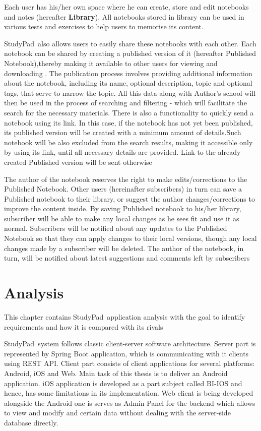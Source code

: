 \documentclass[thesis=B,english]{FITthesis}[2012/10/20]
\newcommand{\appname}{StudyPad}
\begin{document}
Each user has his/her own space where he can create, store and edit notebooks and notes (hereafter \textbf{Library}). All notebooks stored in library can be used in various tests and exercises to help users to memorise its content. 

\appname\ also allows users to easily share these notebooks with each other. Each notebook can be shared by creating a published version of it (hereafter Published Notebook),thereby making it available to other users for viewing and downloading .
The publication process involves providing additional information about the notebook, including its name, optional description, topic and optional tags, that serve to narrow the topic. All this data along with Author's school will then be used in the process of searching and filtering - which will facilitate the search for the necessary materials. There is also a functionality to quickly send a notebook using its link. In this case, if the notebook has not yet been published, its published version will be created with a minimum amount of details.Such notebook will be also excluded from the search results, making it accessible only by using its link, until all necessary details are provided. Link to the already created Published version will be sent otherwise


The author of the notebook reserves the right to make edits/corrections to the Published Notebook. Other users (hereinafter subscribers) in turn can save a Published notebook to their library, or suggest the author changes/corrections to improve the content inside. By saving Published notebook to his/her library, subscriber will be able to make any local changes as he sees fit and use it as normal. Subscribers will be notified about any updates to the Published Notebook so that they can apply changes to their local versions, though any local changes made by a subscriber will be deleted. The author of the notebook, in turn, will be notified about latest suggestions and comments left by subscribers
\chapter{Analysis}
This chapter contains \appname\ application analysis with the goal to identify requirements and how it is compared with its rivals 

\appname\ system follows classic client-server software architecture. Server part is represented by Spring Boot application, which is communicating with it clients using REST API. Client part consists of client applications for several platforms: Android, iOS and Web. Main task of this thesis is to deliver an Android application. iOS application is developed as a part subject called BI-IOS and hence, has some limitations in its implementation. Web client is being developed alongside the Android one is serves as Admin Panel for the backend which allows to view and modify and certain data without dealing with the server-side database directly. 
\end{document}
